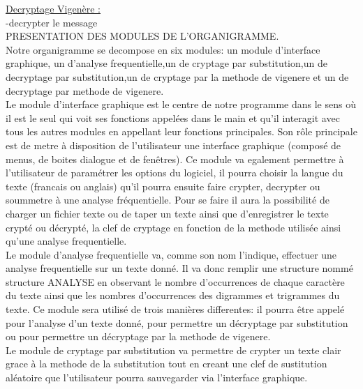 \documentclass[a4]{article}
\begin{document}
			\underline{Decryptage Vigenère :}\\
			-decrypter le message\\
			
			



PRESENTATION DES MODULES DE L'ORGANIGRAMME. \\

	Notre organigramme se decompose en six modules:  un module d'interface graphique, un d'analyse 
	frequentielle,un de cryptage par substitution,un de decryptage par substitution,un de cryptage 
	par la methode de vigenere et un de decryptage par methode de vigenere. \\

	Le module d'interface graphique est le centre de notre programme dans le sens où il est le seul qui voit ses 
	fonctions appelées dans le main et qu'il interagit avec tous les autres modules en appellant leur fonctions principales.
	Son rôle principale est de metre à disposition de l'utilisateur une interface graphique 
	(composé de menus, de boites dialogue et de fenêtres). Ce module va egalement permettre à l'utilisateur de
	 paramétrer les options du logiciel, il pourra choisir la langue du texte (francais ou anglais) qu'il
	  pourra ensuite faire crypter, decrypter ou soummetre à une analyse fréquentielle. Pour se faire il aura
	   la possibilité de charger un fichier texte ou de taper un texte ainsi que d'enregistrer le texte crypté 
	   ou décrypté, la clef de cryptage en fonction de la methode utilisée ainsi qu'une analyse frequentielle. \\
	
	Le module d'analyse frequentielle va, comme son nom l'indique, effectuer une analyse frequentielle sur un texte donné.
	 Il va donc remplir une structure nommé structure ANALYSE en observant le nombre d'occurrences de chaque caractère du 
	 texte ainsi que les nombres d'occurrences des digrammes et trigrammes du texte.
	Ce module sera utilisé de trois manières differentes: il pourra être appelé pour l'analyse d'un texte donné,
	 pour permettre un décryptage par substitution ou pour permettre un décryptage par la methode de vigenere. \\

	Le module de cryptage par substitution va permettre de crypter un texte clair grace à la methode de la substitution
	 tout en creant une clef de sustitution aléatoire que l'utilisateur pourra sauvegarder via l'interface graphique. \\
	
\end{document}
